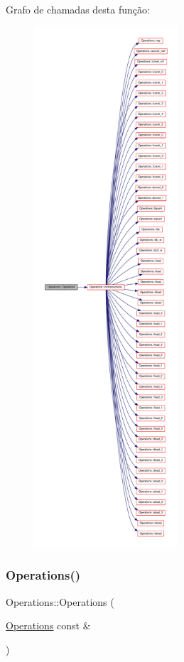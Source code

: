 Grafo de chamadas desta função\+:
\nopagebreak
\begin{figure}[H]
\begin{center}
\leavevmode
\includegraphics[height=550pt]{classOperations_af344ca561c1a08118f686551abb08efb_cgraph}
\end{center}
\end{figure}
\mbox{\label{classOperations_a83982c91620aa947b25b106d78d51e90}} 
\subsubsection{\texorpdfstring{Operations()}{Operations()}\hspace{0.1cm}{\footnotesize\ttfamily [2/2]}}
{\footnotesize\ttfamily Operations\+::\+Operations (\begin{DoxyParamCaption}\item[{\hyperlink{classOperations}{Operations} const \&}]{ }\end{DoxyParamCaption})\hspace{0.3cm}{\ttfamily [private]}}




